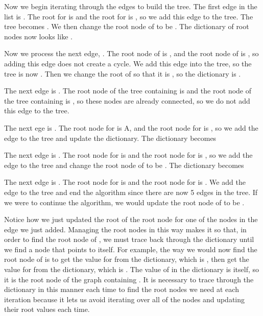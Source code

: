 Now we begin iterating through the edges to build the tree.
The first edge in the list is .
The root for  is  and the root for  is , so we add this edge to the tree.
The tree becomes \li{[(C, D, 1)]}.
We then change the root node of  to be .
The dictionary of root nodes now looks like .

Now we process the next edge, .
The root node of  is , and the root node of  is , so adding this edge does not create a cycle.
We add this edge into the tree, so the tree is now \li{[(C, D, 1), (C, E, 1)]}.
Then we change the root of  so that it is , so the dictionary is .

The next edge is .
The root node of the tree containing  is  and the root node of the tree containing  is , so these nodes are already connected, so we do not add this edge to the tree.

The next ege is .
The root node for  is A, and the root node for  is , so we add the edge to the tree and update the dictionary.
The dictionary becomes 

The next edge is .
The root node for  is  and the root node for  is , so we add the edge to the tree and change the root node of  to be .
The dictionary becomes 

The next edge is .
The root node for  is  and the root node for  is .
We add the edge to the tree and end the algorithm since there are now 5 edges in the tree.
If we were to continue the algorithm, we would update the root node of  to be .

Notice how we just updated the root of the root node for one of the nodes in the edge we just added.
Managing the root nodes in this way makes it so that, in order to find the root node of , we must trace back through the dictionary until we find a node that points to itself.
For example, the way we would now find the root node of  is to get the value for  from the dictionary, which is , then get the value for  from the dictionary, which is .
The value of  in the dictionary is itself, so it is the root node of the graph containing .
It is necessary to trace through the dictionary in this manner each time to find the root nodes we need at each iteration because it lets us avoid iterating over all of the nodes and updating their root values each time.

